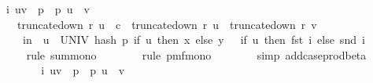 \begin{isabellebody}
\ {\isachardoublequoteopen}{\isachardot}{\kern0pt}{\isachardot}{\kern0pt}{\isachardot}{\kern0pt}\ {\isasymle}\ {\isacharparenleft}{\kern0pt}{\isasymSum}\ i{\isasymin}\ {\isacharbraceleft}{\kern0pt}{\isacharparenleft}{\kern0pt}u{\isacharcomma}{\kern0pt}v{\isacharparenright}{\kern0pt}\ {\isasymin}\ {\isacharbraceleft}{\kern0pt}{}{\isachardot}{\kern0pt}{\isachardot}{\kern0pt}{\isacharless}{\kern0pt}p{\isacharbraceright}{\kern0pt}\ {\isasymtimes}\ {\isacharbraceleft}{\kern0pt}{}{\isachardot}{\kern0pt}{\isachardot}{\kern0pt}{\isacharless}{\kern0pt}p{\isacharbraceright}{\kern0pt}{\isachardot}{\kern0pt}\ u\ {\isasymnoteq}\ v\ {\isasymand}\isanewline
\ \ \ \ \ \ truncate{\isacharunderscore}{\kern0pt}down\ r\ u\ {\isasymle}\ c\ {\isasymand}\ truncate{\isacharunderscore}{\kern0pt}down\ r\ u\ {\isacharequal}{\kern0pt}\ truncate{\isacharunderscore}{\kern0pt}down\ r\ v{\isacharbraceright}{\kern0pt}{\isachardot}{\kern0pt}\ \isanewline
\ \ \ \ \ \ {\isasymP}{\isacharparenleft}{\kern0pt}{\isasymomega}\ in\ {\isasymOmega}{\isachardot}{\kern0pt}\ {\isacharparenleft}{\kern0pt}{\isasymforall}u\ {\isasymin}\ UNIV{\isachardot}{\kern0pt}\ hash\ p\ {\isacharparenleft}{\kern0pt}if\ u\ then\ x\ else\ y{\isacharparenright}{\kern0pt}\ {\isasymomega}\ {\isacharequal}{\kern0pt}\ {\isacharparenleft}{\kern0pt}if\ u\ then\ {\isacharparenleft}{\kern0pt}fst\ i{\isacharparenright}{\kern0pt}\ else\ {\isacharparenleft}{\kern0pt}snd\ i{\isacharparenright}{\kern0pt}{\isacharparenright}{\kern0pt}{\isacharparenright}{\kern0pt}{\isacharparenright}{\kern0pt}{\isacharparenright}{\kern0pt}{\isachardoublequoteclose}\ \isanewline
\ \ \ \ \ \ \isamarkupfalse%
\ {\isacharparenleft}{\kern0pt}rule\ sum{\isacharunderscore}{\kern0pt}mono{\isacharparenright}{\kern0pt}\isanewline
\ \ \ \ \ \ \isamarkupfalse%
\ {\isacharparenleft}{\kern0pt}rule\ pmf{\isacharunderscore}{\kern0pt}mono{\isacharunderscore}{\kern0pt}{}{\isacharparenright}{\kern0pt}\isanewline
\ \ \ \ \ \ \isamarkupfalse%
\ {\isacharparenleft}{\kern0pt}simp\ add{\isacharcolon}{\kern0pt}case{\isacharunderscore}{\kern0pt}prod{\isacharunderscore}{\kern0pt}beta{\isacharparenright}{\kern0pt}\isanewline
\ \ \ \ \isamarkupfalse%
\ \isamarkupfalse%
\ {\isachardoublequoteopen}{\isachardot}{\kern0pt}{\isachardot}{\kern0pt}{\isachardot}{\kern0pt}\ {\isasymle}\ {\isacharparenleft}{\kern0pt}{\isasymSum}\ i{\isasymin}\ {\isacharbraceleft}{\kern0pt}{\isacharparenleft}{\kern0pt}u{\isacharcomma}{\kern0pt}v{\isacharparenright}{\kern0pt}\ {\isasymin}\ {\isacharbraceleft}{\kern0pt}{}{\isachardot}{\kern0pt}{\isachardot}{\kern0pt}{\isacharless}{\kern0pt}p{\isacharbraceright}{\kern0pt}\ {\isasymtimes}\ {\isacharbraceleft}{\kern0pt}{}{\isachardot}{\kern0pt}{\isachardot}{\kern0pt}{\isacharless}{\kern0pt}p{\isacharbraceright}{\kern0pt}{\isachardot}{\kern0pt}\ u\ {\isasymnoteq}\ v\ {\isasymand}\isanewline

\end{isabellebody}
